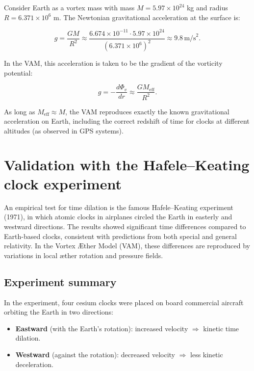 \documentclass[preprint]{revtex4-2}
\begin{document}
Consider Earth as a vortex mass with mass $M = 5.97 \times 10^{24}$ kg and radius $R = 6.371 \times 10^6$ m. The Newtonian gravitational acceleration at the surface is:

\begin{equation}
    g = \frac{G M}{R^2} \approx \frac{6.674 \times 10^{-11} \cdot 5.97 \times 10^{24}}{(6.371 \times 10^6)^2} \approx 9.8 \, \text{m/s}^2.
\end{equation}

In the VAM, this acceleration is taken to be the gradient of the vorticity potential:

\begin{equation}
    g = -\frac{d\Phi_v}{dr} \approx \frac{G M_\text{eff}}{R^2}.
\end{equation}

As long as $M_\text{eff} \approx M$, the VAM reproduces exactly the known gravitational acceleration on Earth, including the correct redshift of time for clocks at different altitudes (as observed in GPS systems).

\section{Validation with the Hafele–Keating clock experiment}

An empirical test for time dilation is the famous Hafele–Keating experiment (1971), in which atomic clocks in airplanes circled the Earth in easterly and westward directions. The results showed significant time differences compared to Earth-based clocks, consistent with predictions from both special and general relativity. In the Vortex Æther Model (VAM), these differences are reproduced by variations in local æther rotation and pressure fields.

\subsection{Experiment summary}

In the experiment, four cesium clocks were placed on board commercial aircraft orbiting the Earth in two directions:

\begin{itemize}
    \item \textbf{Eastward} (with the Earth's rotation): increased velocity $\Rightarrow$ kinetic time dilation.
    \item \textbf{Westward} (against the rotation): decreased velocity $\Rightarrow$ less kinetic deceleration.
\end{itemize}
\end{document}
